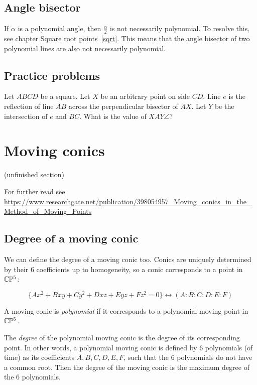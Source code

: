 \documentclass[a4paper]{article}
\begin{document}
\subsection{Angle bisector}

If $\alpha$ is a polynomial angle, then $\frac{\alpha}{2}$ is not necessarily polynomial. To resolve this, see chapter Square root points~\ref{sqrt}.
This means that the angle bisector of two polynomial lines are also not necessarily polynomial.

\subsection{Practice problems}

\begin{exercise}
    Let $ABCD$ be a square. Let $X$ be an arbitrary point on side $CD$. Line $e$ is the reflection of line $AB$ across the perpendicular bisector of $AX$. Let $Y$ be the intersection of $e$ and $BC$. What is the value of $XAY\angle$?
\end{exercise}



\section{Moving conics}

(unfinished section)

For further read see 
\url{https://www.researchgate.net/publication/398054957_Moving_conics_in_the_Method_of_Moving_Points}
\subsection{Degree of a moving conic}
We can define the degree of a moving conic too. Conics are uniquely determined by their 6 coefficients up to homogeneity, so a conic corresponds to a point in $\mathbb{C}\mathbb{P}^5$:

$$\{Ax^2+Bxy+Cy^2+Dxz+Eyz+Fz^2=0\} \leftrightarrow (A:B:C:D:E:F)$$

A moving conic is \textit{polynomial} if it corresponds to a polynomial moving point in $\mathbb{C}\mathbb{P}^5$.

The \textit{degree} of the polynomial moving conic is the degree of its corresponding point. In other words, a polynomial moving conic is defined by 6 polynomials (of time) as its coefficients $A,B,C,D,E,F$, such that the 6 polynomials do not have a common root. Then the degree of the moving conic is the maximum degree of the 6 polynomials.
\end{document}
